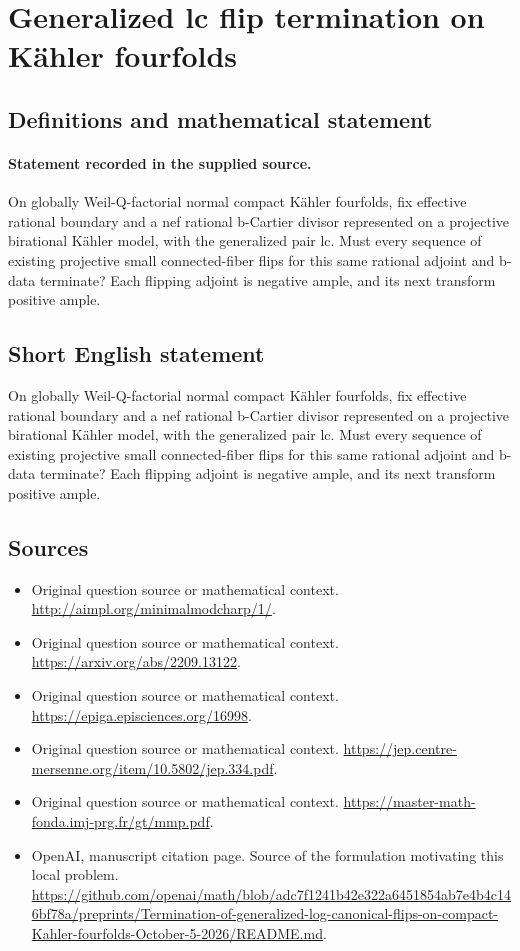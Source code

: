 \documentclass[11pt]{article}
\begin{document}
\section*{Generalized lc flip termination on Kähler fourfolds}\label{30007028}
\subsection{Definitions and mathematical statement}
\paragraph{Statement recorded in the supplied source.}
On globally Weil-Q-factorial normal compact Kähler fourfolds, fix effective rational boundary and a nef rational b-Cartier divisor represented on a projective birational Kähler model, with the generalized pair lc. Must every sequence of existing projective small connected-fiber flips for this same rational adjoint and b-data terminate? Each flipping adjoint is negative ample, and its next transform positive ample.
\subsection{Short English statement}
On globally Weil-Q-factorial normal compact Kähler fourfolds, fix effective rational boundary and a nef rational b-Cartier divisor represented on a projective birational Kähler model, with the generalized pair lc. Must every sequence of existing projective small connected-fiber flips for this same rational adjoint and b-data terminate? Each flipping adjoint is negative ample, and its next transform positive ample.
\subsection{Sources}
\begin{itemize}
\item[S1] Original question source or mathematical context.
\url{http://aimpl.org/minimalmodcharp/1/}.
\item[S2] Original question source or mathematical context.
\url{https://arxiv.org/abs/2209.13122}.
\item[S3] Original question source or mathematical context.
\url{https://epiga.episciences.org/16998}.
\item[S4] Original question source or mathematical context.
\url{https://jep.centre-mersenne.org/item/10.5802/jep.334.pdf}.
\item[S5] Original question source or mathematical context.
\url{https://master-math-fonda.imj-prg.fr/gt/mmp.pdf}.
\item[S6] OpenAI, manuscript citation page. Source of the formulation motivating this local problem.
\url{https://github.com/openai/math/blob/adc7f1241b42e322a6451854ab7e4b4c146bf78a/preprints/Termination-of-generalized-log-canonical-flips-on-compact-Kahler-fourfolds-October-5-2026/README.md}.
\end{itemize}
\end{document}
